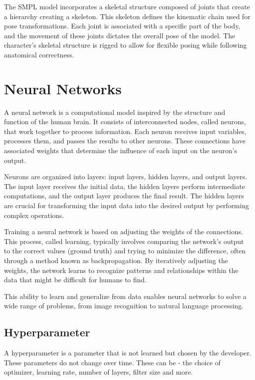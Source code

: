 The SMPL model incorporates a skeletal structure composed of joints that create a hierarchy creating a skeleton. This skeleton defines the kinematic chain used for pose transformations. Each joint is associated with a specific part of the body, and the movement of these joints dictates the overall pose of the model. The character's skeletal structure is rigged to allow for flexible posing while following anatomical correctness.


\section{Neural Networks}
A neural network is a computational model inspired by the structure and function of the human brain. It consists of interconnected nodes, called neurons, that work together to process information. Each neuron receives input variables, processes them, and passes the results to other neurons. These connections have associated weights that determine the influence of each input on the neuron's output.

Neurons are organized into layers: input layers, hidden layers, and output layers. The input layer receives the initial data, the hidden layers perform intermediate computations, and the output layer produces the final result. The hidden layers are crucial for transforming the input data into the desired output by performing complex operations.

Training a neural network is based on adjusting the weights of the connections. This process, called learning, typically involves comparing the network's output to the correct values (ground truth) and trying to minimize the difference, often through a method known as backpropagation. By iteratively adjusting the weights, the network learns to recognize patterns and relationships within the data that might be difficult for humans to find.

This ability to learn and generalize from data enables neural networks to solve a wide range of problems, from image recognition to natural language processing.

\subsection{Hyperparameter}
A hyperparameter is a parameter that is not learned but chosen by the developer.  These parameters do not change over time. These can be - the choice of optimizer, learning rate,  number of layers, filter size and more.\\\\
